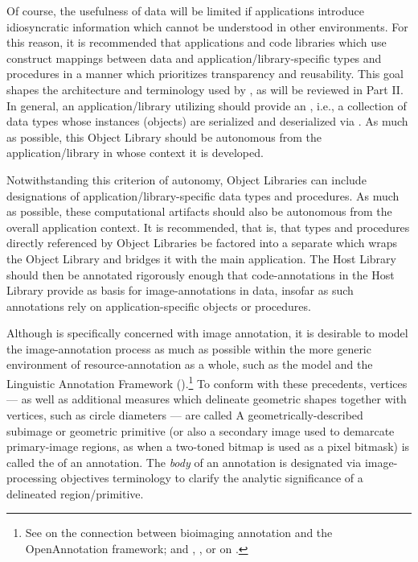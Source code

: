 {\begin{description}
Of course, the usefulness of \AXFI{} data will 
be limited if applications introduce idiosyncratic 
information which cannot be understood in other 
\AXFI{} environments.  For this reason, it is 
recommended that applications and code libraries 
which use \AXFI{} construct mappings between 
\AXFI{} data and application/library-specific 
types and procedures in a manner which prioritizes 
transparency and reusability.  This goal shapes 
the architecture and terminology used by 
\AXFI{}, as will be reviewed in Part II.  
In general, an application/library utilizing 
\AXFI{} should provide an , 
i.e., a collection of data types whose instances 
(objects) are serialized and deserialized via 
\AXFI{}.  As much as possible, this Object Library 
should be autonomous from the application/library 
in whose context it is developed.

Notwithstanding this criterion of autonomy, 
\AXFI{} Object Libraries can include designations 
of application/library-specific data types 
and procedures.  As much as possible, these 
computational artifacts should also be 
autonomous from the overall application context.  
It is recommended, that is, that types and 
procedures directly referenced by \AXFI{} Object 
Libraries be factored into a separate 
 which wraps 
the Object Library and bridges it with the 
main application.  The Host Library should 
then be annotated rigorously enough that 
code-annotations in the Host Library 
provide as basis for image-annotations 
in \AXFI{} data, insofar as such annotations 
rely on application-specific objects or procedures. 

\item[Annotation Body and Targets]  Although 
\AXFI{} is specifically concerned with 
image annotation, it is desirable to model 
the image-annotation process as much as possible 
within the more generic environment of 
resource-annotation as a whole, such 
as the  model and the 
Linguistic Annotation Framework 
(\LAF{}).\footnote{See  on the connection between bioimaging 
annotation and the OpenAnnotation framework; 
and , , or  on \sLAF{}.}  To conform with 
these precedents, \AXFI{} vertices --- as well 
as additional measures which delineate geometric 
shapes together with vertices, such as circle 
diameters --- are called   A 
geometrically-described subimage or geometric primitive 
(or also a secondary image used to demarcate 
primary-image regions, as when a two-toned bitmap 
is used as a pixel bitmask) is called 
the  of an annotation.  The \textit{body} 
of an annotation is designated via 
image-processing objectives terminology to 
clarify the analytic significance of a 
delineated region/primitive.


\end{description}}
